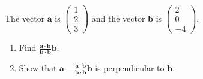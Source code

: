 
\begin{problem}
The vector $\mathbf{a}$ is $\begin{pmatrix} 1 \\ 2 \\ 3 \end{pmatrix}$ and the vector $\mathbf{b}$ is $\begin{pmatrix} 2 \\ 0 \\ -4 \end{pmatrix}$.
\begin{enumerate}[label=(\roman*)]
    \item Find $\tfrac{\mathbf{a} \cdot \mathbf{b}}{\mathbf{b} \cdot \mathbf{b}} \mathbf{b}$.
    \item Show that $\mathbf{a} - \tfrac{\mathbf{a} \cdot \mathbf{b}}{\mathbf{b} \cdot \mathbf{b}} \mathbf{b}$ is perpendicular to $\mathbf{b}$.
\end{enumerate}
\end{problem}

